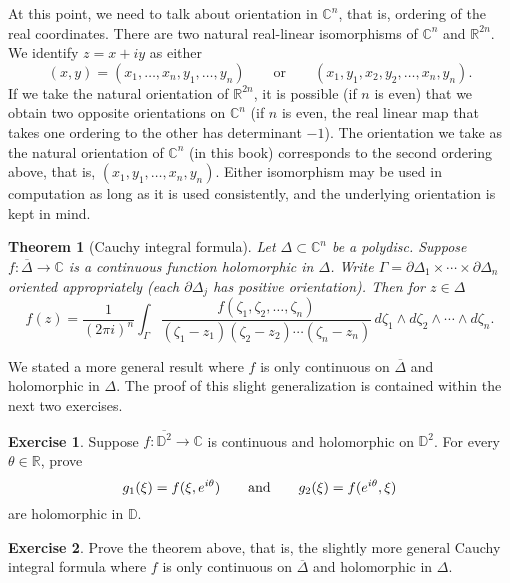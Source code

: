 \documentclass[12pt,openany]{book}
\newcommand{\avoidbreak}{\postdisplaypenalty=100}
\newcommand{\C}{{\mathbb{C}}}
\newcommand{\R}{{\mathbb{R}}}
\newcommand{\D}{{\mathbb{D}}}
\theoremstyle{plain}
\newtheorem{thm}{Theorem}[section]
\theoremstyle{remark}
\theoremstyle{definition}
\newenvironment{exbox}{%
    \def\FrameCommand{\vrule width 1pt \relax\hspace{10pt}}%
    \MakeFramed{\advance\hsize-\width\FrameRestore}%
}{%
    \endMakeFramed
}
\theoremstyle{exercise}
\newtheorem{exercise}{Exercise}[section]
\theoremstyle{example}
\begin{document}
At this point, we need to talk about orientation in $\C^n$, that is,
ordering of the real coordinates.  There are two
natural real-linear isomorphisms of $\C^n$ and $\R^{2n}$.  We
identify $z = x+iy$ as either
\begin{equation*}
(x,y) = (x_1,\ldots,x_n,y_1,\ldots,y_n) \qquad
\text{or} \qquad
(x_1,y_1,x_2,y_2,\ldots,x_n,y_n) .
\end{equation*}
If we take the natural orientation of $\R^{2n}$,
it is possible (if $n$ is even) that we obtain
two opposite orientations on $\C^n$ (if $n$ is even, the real linear map
that takes one ordering to the other has determinant $-1$).
The orientation we take as the natural orientation of $\C^n$ (in this book)
corresponds to
the second ordering above, that
is, $(x_1,y_1,\ldots,x_n,y_n)$.  Either isomorphism may be used
in computation as long as it is used consistently, and the underlying
orientation is kept in mind.

\begin{thm}[Cauchy integral formula]
Let $\Delta \subset \C^n$ be a polydisc. 
Suppose
$f \colon \overline{\Delta} \to \C$ is a continuous function
holomorphic in $\Delta$.
Write $\Gamma = \partial \Delta_1 \times \cdots \times \partial \Delta_n$
oriented appropriately (each $\partial \Delta_j$ has positive orientation).
Then for $z \in \Delta$
\begin{equation*}
f(z) =
\frac{1}{{(2\pi i)}^n}
\int_{\Gamma}
\frac{f(\zeta_1,\zeta_2,\ldots,\zeta_n)}{(\zeta_1-z_1)(\zeta_2-z_2)\cdots(\zeta_n-z_n)}
\,
d \zeta_1 
\wedge
d \zeta_2
\wedge
\cdots
\wedge
d \zeta_n .
\end{equation*}
\end{thm}

We stated a more general result where $f$ is only continuous 
on $\overline{\Delta}$ and holomorphic in $\Delta$.  The proof of this
slight generalization is contained within the next two exercises.

\begin{exbox}
\begin{exercise}
Suppose $f \colon \overline{\D^2} \to \C$ is continuous and holomorphic
on $\D^2$.  For every $\theta \in \R$, prove
\begin{equation*}
g_1(\xi) = f(\xi,e^{i\theta}) \qquad \text{and} \qquad
g_2(\xi) = f(e^{i\theta},\xi)
\avoidbreak
\end{equation*}
are holomorphic in $\D$.
\end{exercise}

\begin{exercise}
Prove the theorem above, that is, the slightly more general Cauchy integral
formula where $f$ is only continuous on $\overline{\Delta}$ and
holomorphic in $\Delta$.
\end{exercise}
\end{exbox}
\end{document}
